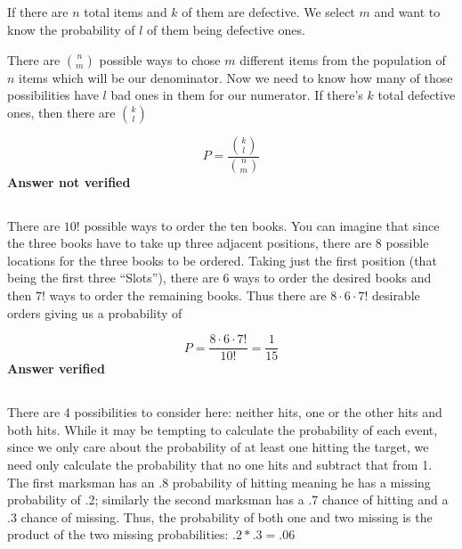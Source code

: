 \subsection{}

If there are $n$ total items and $k$ of them are defective.  We select $m$ and want to know the probability of $l$ of them being defective ones.

There are $\binom{n}{m}$ possible ways to chose $m$ different items from the population of $n$ items which will be our denominator.  Now we need to know how many of those possibilities have $l$ bad ones in them for our numerator.  If there's $k$ total defective ones, then there are $\binom{k}{l}$

\begin{equation}
	P = \frac{\binom{k}{l}}{\binom{n}{m}}
\label{answer1.3}
\end{equation}
\textbf{Answer not verified}


\subsection{}

There are $10!$ possible ways to order the ten books.  You can imagine that since the three books have to take up three adjacent positions, there are 8 possible locations for the three books to be ordered.  Taking just the first position (that being the first three ``Slots''), there are 6 ways to order the desired books and then $7!$ ways to order the remaining books.  Thus there are $8 \cdot{} 6 \cdot{} 7!$ desirable orders giving us a probability of

\begin{equation}
	P=\frac{8 \cdot{} 6 \cdot{} 7!}{10!}=\frac{1}{15}
\label{answer1.4}
\end{equation}
\textbf{Answer  verified}

\subsection{}

There are 4 possibilities to consider here: neither hits, one or the other hits and both hits.  While it may be tempting to calculate the probability of each event, since we only care about the probability of at least one hitting the target, we need only calculate the probability that no one hits and subtract that from 1.  The first marksman has an $.8$ probability of hitting meaning he has a missing probability of .2; similarly the second marksman has a .7 chance of hitting and a .3 chance of missing.  Thus, the probability of both one and two missing is the product of the two missing probabilities: $.2*.3=.06$

